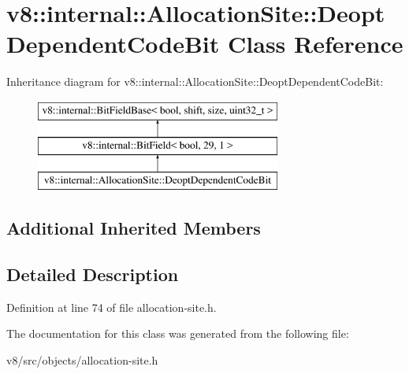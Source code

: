 \hypertarget{classv8_1_1internal_1_1AllocationSite_1_1DeoptDependentCodeBit}{}\section{v8\+:\+:internal\+:\+:Allocation\+Site\+:\+:Deopt\+Dependent\+Code\+Bit Class Reference}
\label{classv8_1_1internal_1_1AllocationSite_1_1DeoptDependentCodeBit}
Inheritance diagram for v8\+:\+:internal\+:\+:Allocation\+Site\+:\+:Deopt\+Dependent\+Code\+Bit\+:\begin{figure}[H]
\begin{center}
\leavevmode
\includegraphics[height=3.000000cm]{classv8_1_1internal_1_1AllocationSite_1_1DeoptDependentCodeBit}
\end{center}
\end{figure}
\subsection*{Additional Inherited Members}


\subsection{Detailed Description}


Definition at line 74 of file allocation-\/site.\+h.



The documentation for this class was generated from the following file\+:\begin{DoxyCompactItemize}
\item 
v8/src/objects/allocation-\/site.\+h\end{DoxyCompactItemize}

